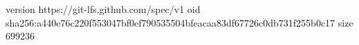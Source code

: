 version https://git-lfs.github.com/spec/v1
oid sha256:a440e76c220f553047bf0ef790535504bfeacaa83df67726c0db731f255b0c17
size 699236
